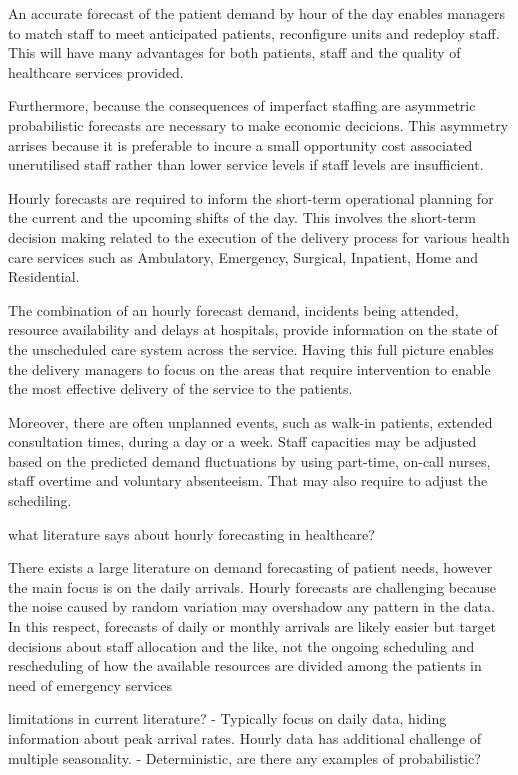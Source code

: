 \documentclass[]{elsarticle} %
\begin{document}
An accurate forecast of the patient demand by hour of the day enables managers to match staff to meet anticipated patients, reconfigure units and redeploy staff. This will have many advantages for both patients, staff and the quality of healthcare services provided.

Furthermore, because the consequences of imperfact staffing are asymmetric probabilistic forecasts are necessary to make economic decicions. This asymmetry arrises because it is preferable to incure a small opportunity cost associated unerutilised staff rather than lower service levels if staff levels are insufficient.

Hourly forecasts are required to inform the short-term operational planning for the current and the upcoming shifts of the day. This involves the short-term decision making related to the execution of the delivery process for various health care services such as Ambulatory, Emergency, Surgical, Inpatient, Home and Residential.

The combination of an hourly forecast demand, incidents being attended, resource availability and delays at hospitals, provide information on the state of the unscheduled care system across the service. Having this full picture enables the delivery managers to focus on the areas that require intervention to enable the most effective delivery of the service to the patients.

Moreover, there are often unplanned events, such as walk-in patients, extended consultation times, during a day or a week. Staff capacities may be adjusted based on the predicted demand fluctuations by using part-time, on-call nurses, staff overtime and voluntary absenteeism. That may also require to adjust the schediling.

what literature says about hourly forecasting in healthcare?

There exists a large literature on demand forecasting of patient needs, however the main focus is on the daily arrivals. Hourly forecasts are challenging because the noise caused by random variation may overshadow any pattern in the data. In this respect, forecasts of daily or monthly arrivals are likely easier but target decisions about staff allocation and the like, not the ongoing scheduling and rescheduling of how the available resources are divided among the patients in need of emergency services

limitations in current literature?
- Typically focus on daily data, hiding information about peak arrival rates. Hourly data has additional challenge of multiple seasonality.
- Deterministic, are there any examples of probabilistic?
\end{document}
